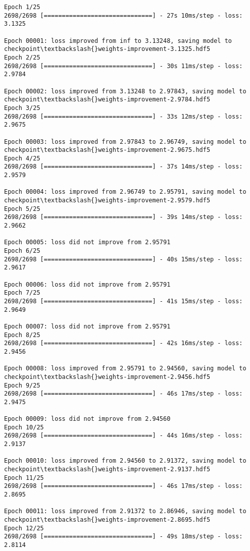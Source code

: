 \documentclass[11pt]{article}
\begin{document}
    \begin{Verbatim}[commandchars=\\\{\}]
Epoch 1/25
2698/2698 [==============================] - 27s 10ms/step - loss: 3.1325

Epoch 00001: loss improved from inf to 3.13248, saving model to
checkpoint\textbackslash{}weights-improvement-3.1325.hdf5
Epoch 2/25
2698/2698 [==============================] - 30s 11ms/step - loss: 2.9784

Epoch 00002: loss improved from 3.13248 to 2.97843, saving model to
checkpoint\textbackslash{}weights-improvement-2.9784.hdf5
Epoch 3/25
2698/2698 [==============================] - 33s 12ms/step - loss: 2.9675

Epoch 00003: loss improved from 2.97843 to 2.96749, saving model to
checkpoint\textbackslash{}weights-improvement-2.9675.hdf5
Epoch 4/25
2698/2698 [==============================] - 37s 14ms/step - loss: 2.9579

Epoch 00004: loss improved from 2.96749 to 2.95791, saving model to
checkpoint\textbackslash{}weights-improvement-2.9579.hdf5
Epoch 5/25
2698/2698 [==============================] - 39s 14ms/step - loss: 2.9662

Epoch 00005: loss did not improve from 2.95791
Epoch 6/25
2698/2698 [==============================] - 40s 15ms/step - loss: 2.9617

Epoch 00006: loss did not improve from 2.95791
Epoch 7/25
2698/2698 [==============================] - 41s 15ms/step - loss: 2.9649

Epoch 00007: loss did not improve from 2.95791
Epoch 8/25
2698/2698 [==============================] - 42s 16ms/step - loss: 2.9456

Epoch 00008: loss improved from 2.95791 to 2.94560, saving model to
checkpoint\textbackslash{}weights-improvement-2.9456.hdf5
Epoch 9/25
2698/2698 [==============================] - 46s 17ms/step - loss: 2.9475

Epoch 00009: loss did not improve from 2.94560
Epoch 10/25
2698/2698 [==============================] - 44s 16ms/step - loss: 2.9137

Epoch 00010: loss improved from 2.94560 to 2.91372, saving model to
checkpoint\textbackslash{}weights-improvement-2.9137.hdf5
Epoch 11/25
2698/2698 [==============================] - 46s 17ms/step - loss: 2.8695

Epoch 00011: loss improved from 2.91372 to 2.86946, saving model to
checkpoint\textbackslash{}weights-improvement-2.8695.hdf5
Epoch 12/25
2698/2698 [==============================] - 49s 18ms/step - loss: 2.8114


\end{Verbatim}
\end{document}
